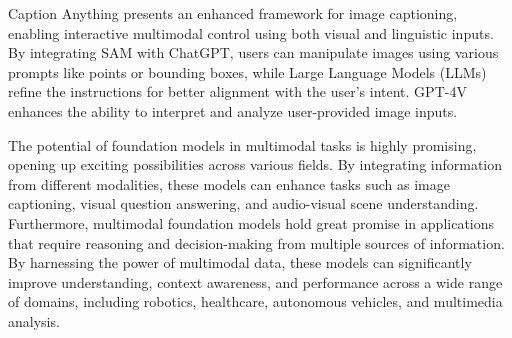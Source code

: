 Caption Anything \cite{back34} presents an enhanced framework for image captioning, enabling interactive multimodal control using both visual and linguistic inputs. By integrating SAM with ChatGPT, users can manipulate images using various prompts like points or bounding boxes, while Large Language Models (LLMs) refine the instructions for better alignment with the user's intent. GPT-4V enhances the ability to interpret and analyze user-provided image inputs.

The potential of foundation models in multimodal tasks is highly promising, opening up exciting possibilities across various fields. By integrating information from different modalities, these models can enhance tasks such as image captioning, visual question answering, and audio-visual scene understanding. Furthermore, multimodal foundation models hold great promise in applications that require reasoning and decision-making from multiple sources of information. By harnessing the power of multimodal data, these models can significantly improve understanding, context awareness, and performance across a wide range of domains, including robotics, healthcare, autonomous vehicles, and multimedia analysis.